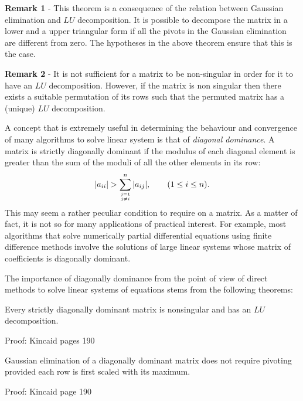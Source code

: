 \noindent
\textbf{Remark 1} - This theorem is a consequence of the relation
between Gaussian elimination and $LU$ decomposition.   It is possible to
decompose the matrix in a lower and a upper triangular form if all the
pivots in the Gaussian elimination are different from zero.   The
hypotheses in the above theorem ensure that this is the case.

\smallskip

\noindent
\textbf{Remark 2} - It is not sufficient for a matrix to be
non-singular in order for it to have an $LU$ decomposition.  However, if
the matrix is non singular then there exists a suitable permutation of
its rows such that the permuted matrix has a (unique)
$LU$ decomposition.

A concept that is extremely useful in determining the behaviour and
convergence of many algorithms to solve linear system is that of
\textit{diagonal dominance}.   A matrix is strictly diagonally dominant if the
modulus of each diagonal element is greater than the sum of the moduli
of all the other elements in its row:
%
\begin{equation*}
  | a_{i i} | > \sum_{\genfrac{}{}{0pt}{}{j=1}{j \ne i}}^n 
  | a_{i j} |, \qquad (1 \le i \le n) .
\end{equation*}
%
This may seem a rather peculiar condition to require on a matrix.   As
a matter of fact, it is not so for many applications of practical
interest.   For example, most algorithms that solve numerically
partial differential equations using finite difference methods involve
the solutions of large linear systems whose matrix of coefficients is
diagonally dominant.

The importance of diagonally dominance from the point of view of
direct methods to solve linear systems of equations stems from the
following theorems:

\begin{theorem}
\label{diagdom1}
Every strictly diagonally dominant matrix is nonsingular and has an
$LU$ decomposition.
\end{theorem}

\noindent Proof: Kincaid pages 190

\begin{theorem}
\label{diagdom2}
Gaussian elimination of a diagonally dominant matrix does not require
pivoting provided each row is first scaled with its maximum.
\end{theorem}

\noindent Proof: Kincaid page 190


